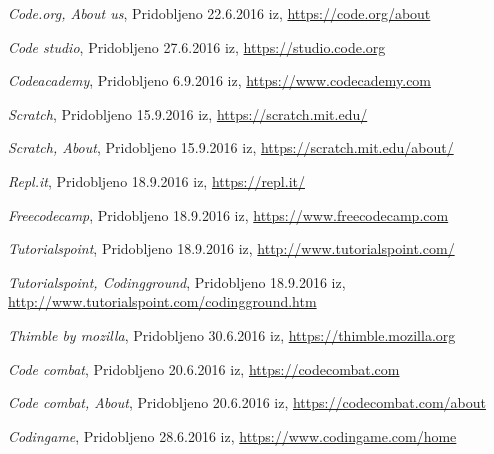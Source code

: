 \begin{thebibliography}{100}
 \emph{Code.org, About us}, Pridobljeno
  22.6.2016 iz, \url{https://code.org/about}

 \emph{Code studio}, Pridobljeno
  27.6.2016 iz, \url{https://studio.code.org}

 \emph{Codeacademy}, Pridobljeno 6.9.2016 iz,
  \url{https://www.codecademy.com}

 \emph{Scratch}, Pridobljeno 15.9.2016 iz,
  \url{https://scratch.mit.edu/}

 \emph{Scratch, About}, Pridobljeno 15.9.2016 iz,
  \url{https://scratch.mit.edu/about/}

 \emph{Repl.it}, Pridobljeno 18.9.2016 iz,
  \url{https://repl.it/}

 \emph{Freecodecamp}, Pridobljeno 18.9.2016 iz,
  \url{https://www.freecodecamp.com}

 \emph{Tutorialspoint}, Pridobljeno 18.9.2016 iz,
  \url{http://www.tutorialspoint.com/}

 \emph{Tutorialspoint,
    Codingground}, Pridobljeno 18.9.2016 iz,
  \url{http://www.tutorialspoint.com/codingground.htm}

 \emph{Thimble by mozilla}, Pridobljeno
  30.6.2016 iz, \url{https://thimble.mozilla.org}

 \emph{Code combat}, Pridobljeno 20.6.2016 iz,
  \url{https://codecombat.com}

 \emph{Code combat, About}, Pridobljeno
  20.6.2016 iz, \url{https://codecombat.com/about}

 \emph{Codingame}, Pridobljeno 28.6.2016 iz,
  \url{https://www.codingame.com/home}

\end{thebibliography}


